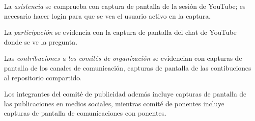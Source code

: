 La {\em asistencia} se comprueba con captura de pantalla de la
sesi\'{o}n de YouTube; es necesario hacer login para que se vea el
usuario activo en la captura.

La {\em participaci\'{o}n} se evidencia con la captura de pantalla del
chat de YouTube donde se ve la pregunta.

Las {\em contribuciones a los comit\'{e}s de organizaci\'{o}n} se
evidencian con capturas de pantalla de los canales de
comunicaci\'{o}n, capturas de pantalla de las contibuciones al
repositorio compartido.

Los integrantes del comit\'{e} de publicidad adem\'{a}s incluye
capturas de pantalla de las publicaciones en medios sociales, mientras
comit\'{e} de ponentes incluye capturas de pantalla de comunicaciones
con ponentes. 
